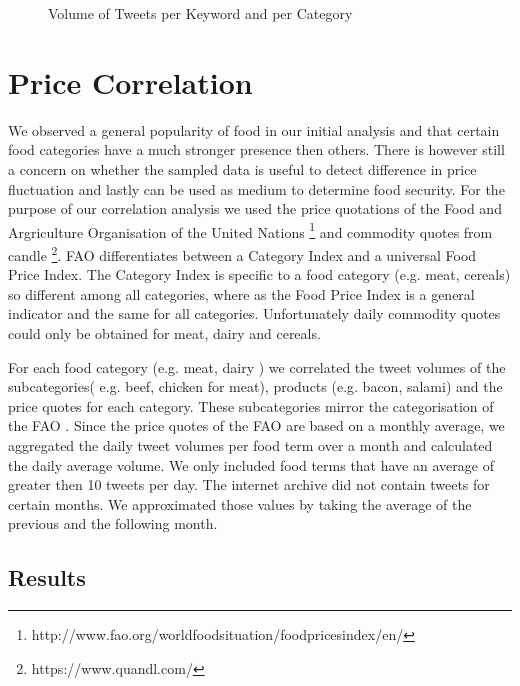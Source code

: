 \begin{figure}[H]
        \caption{Volume of Tweets per Keyword and per Category}\label{fig:distribution}
\end{figure}


\section{Price Correlation}


We observed a general popularity of food in our initial analysis and that certain food categories have a much stronger presence then others. There is however still a concern on whether the sampled data is useful to detect difference in price fluctuation and lastly can  be used as medium to determine food security. For the purpose of our correlation analysis we used the price quotations of the Food and Argriculture Organisation of the United Nations \footnote{http://www.fao.org/worldfoodsituation/foodpricesindex/en/} and commodity quotes from candle \footnote{https://www.quandl.com/}. FAO differentiates between a Category Index and a universal Food Price Index. The Category Index is specific to a food category (e.g. meat, cereals) so different among all categories, where as the Food Price Index is a general indicator and  the same for all categories. Unfortunately daily commodity quotes could only be obtained for meat, dairy and cereals. 

For each food category (e.g. meat, dairy ) we correlated the tweet volumes of the subcategories( e.g. beef, chicken for meat), products (e.g. bacon, salami) and the price quotes for each category. These subcategories mirror the categorisation of the FAO \cite{fao2008}. Since the price quotes of the FAO are based on a monthly average, we aggregated the daily tweet volumes per food term over a month and calculated the daily average volume. We only included food terms that have an average of greater then 10 tweets per day. The internet archive did not contain tweets for certain months. We approximated those values by taking the average of the previous and the following month. 

\subsection{Results} 
\label{corr_results}

